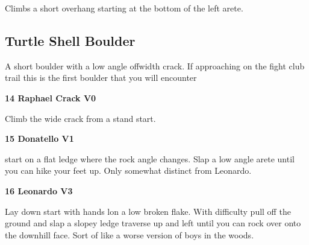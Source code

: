 \begin{multicols}{2}
\begin{minipage}{\linewidth}
					\begin{adjustwidth}{0.5cm}{}				
					Climbs a short overhang starting at the bottom of the left arete.
					\end{adjustwidth}
					\end{minipage}
			\begin{minipage}{\columnwidth}
			\subsection*{Turtle Shell Boulder}\label{bf:Turtle Shell Boulder}
			A short boulder with a low angle offwidth crack. If approaching on the fight club trail this is the first boulder that you will encounter
			
			\end{minipage}
			

					\begin{minipage}{\linewidth}	
					\label{rt:Raphael Crack}
\colorbox{green!20}{
\parbox{0.95\textwidth}{
\textbf{
14 Raphael Crack V0   
}
}
}

					\begin{adjustwidth}{0.5cm}{}				
					Climb the wide crack from a stand start.
					\end{adjustwidth}
					\end{minipage}
					\begin{minipage}{\linewidth}	
					\label{rt:Donatello}
\colorbox{green!20}{
\parbox{0.95\textwidth}{
\textbf{
15 Donatello V1   
}
}
}

					\begin{adjustwidth}{0.5cm}{}				
					start on a flat ledge where the rock angle changes. Slap a low angle arete until you can hike your feet up. Only somewhat distinct from Leonardo.
					\end{adjustwidth}
					\end{minipage}
					\begin{minipage}{\linewidth}	
					\label{rt:Leonardo}
\colorbox{green!20}{
\parbox{0.95\textwidth}{
\textbf{
16 Leonardo V3   
}
}
}

					\begin{adjustwidth}{0.5cm}{}				
					Lay down start with hands lon a low broken flake. With difficulty pull off the ground and slap a slopey ledge traverse up and left until you can rock over onto the downhill face. Sort of like a worse version of boys in the woods.
					\end{adjustwidth}
					\end{minipage}
\newpage


\end{multicols}
